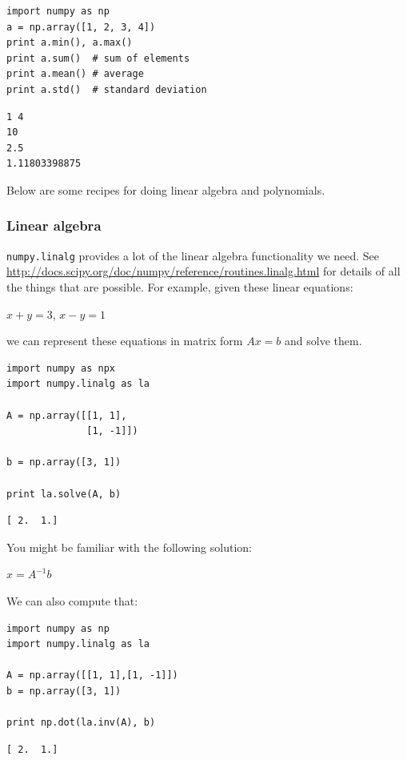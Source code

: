 \documentclass[11pt]{article}
\begin{document}
\begin{verbatim}
import numpy as np
a = np.array([1, 2, 3, 4])
print a.min(), a.max()
print a.sum()  # sum of elements
print a.mean() # average
print a.std()  # standard deviation
\end{verbatim}

\begin{verbatim}
1 4
10
2.5
1.11803398875
\end{verbatim}


Below are some recipes for doing linear algebra and polynomials.


\subsubsection{Linear algebra}
\label{sec-3-11-2}
\texttt{numpy.linalg} provides a lot of the linear algebra functionality we need. See \url{http://docs.scipy.org/doc/numpy/reference/routines.linalg.html} for details of all the things that are possible. For example, given these linear equations:

$x + y = 3$, 
$x - y = 1$

we can represent these equations in matrix form $A x = b$ and solve them.

\begin{verbatim}
import numpy as npx
import numpy.linalg as la

A = np.array([[1, 1],
              [1, -1]])

b = np.array([3, 1])

print la.solve(A, b)
\end{verbatim}

\begin{verbatim}
[ 2.  1.]
\end{verbatim}

You might be familiar with the following solution:

$x = A^{-1} b$

We can also compute that:

\begin{verbatim}
import numpy as np
import numpy.linalg as la

A = np.array([[1, 1],[1, -1]])
b = np.array([3, 1])

print np.dot(la.inv(A), b)
\end{verbatim}

\begin{verbatim}
[ 2.  1.]
\end{verbatim}
\end{document}
